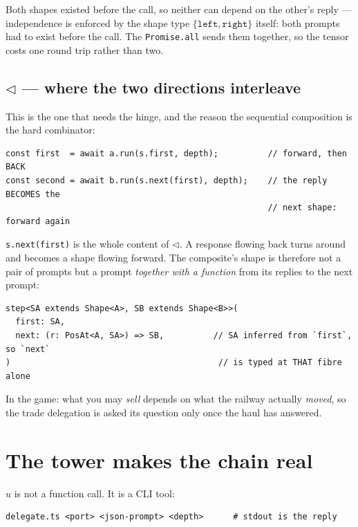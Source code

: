 \documentclass[11pt,a4paper]{article}
\begin{document}
\noindent Both shapes existed before the call, so neither can depend on the
other's reply --- independence is enforced by the shape type
$\{\texttt{left}, \texttt{right}\}$ itself: both prompts had to exist before the
call. The \texttt{Promise.all} sends them together, so the tensor costs one
round trip rather than two.

\subsection*{$\lhd$ --- where the two directions interleave}

This is the one that needs the hinge, and the reason the sequential composition
is the hard combinator:

\begin{lstlisting}
const first  = await a.run(s.first, depth);          // forward, then BACK
const second = await b.run(s.next(first), depth);    // the reply BECOMES the
                                                     // next shape: forward again
\end{lstlisting}

\noindent \texttt{s.next(first)} is the whole content of $\lhd$. A response
flowing back turns around and becomes a shape flowing forward. The composite's
shape is therefore not a pair of prompts but a prompt \emph{together with a
function} from its replies to the next prompt:

\begin{lstlisting}
step<SA extends Shape<A>, SB extends Shape<B>>(
  first: SA,
  next: (r: PosAt<A, SA>) => SB,          // SA inferred from `first`, so `next`
)                                          // is typed at THAT fibre alone
\end{lstlisting}

\noindent In the game: what you may \emph{sell} depends on what the railway
actually \emph{moved}, so the trade delegation is asked its question only once
the haul has answered.

\section{The tower makes the chain real}

$u$ is not a function call. It is a CLI tool:

\begin{lstlisting}
delegate.ts <port> <json-prompt> <depth>      # stdout is the reply
\end{lstlisting}
\end{document}
